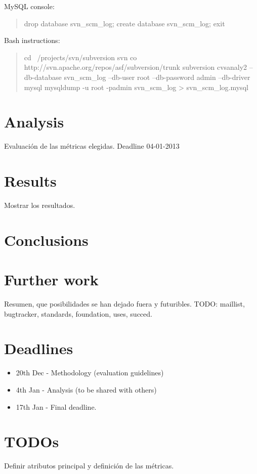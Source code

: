 \documentclass[11pt]{scrartcl}
\begin{document}
MySQL console:

\begin{quote}
    drop database svn\_scm\_log;
    create database svn\_scm\_log;
    exit
\end{quote}

Bash instructions:

\begin{quote}
    cd ~/projects/svn/subversion
    svn co http://svn.apache.org/repos/asf/subversion/trunk subversion
    cvsanaly2 --db-database svn\_scm\_log --db-user root --db-password admin --db-driver mysql
    mysqldump -u root -padmin svn\_scm\_log > svn\_scm\_log.mysql
\end{quote}

\section{Analysis}

Evaluación de las métricas elegidas.
Deadline 04-01-2013

\section{Results}

Mostrar los resultados.

\section{Conclusions}

\section{Further work}

Resumen, que posibilidades se han dejado fuera y futuribles.
TODO: maillist, bugtracker, standards, foundation, uses, succed.

\section{Deadlines}

\begin{itemize}
    \item 20th Dec - Methodology (evaluation guidelines)
    \item 4th Jan - Analysis (to be shared with others)
    \item 17th Jan - Final deadline.
\end{itemize}

\section{TODOs}

Definir atributos principal y definición de las métricas.
\end{document}
